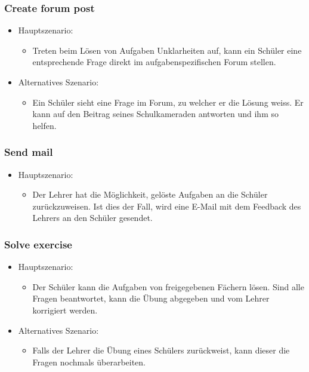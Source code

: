 \subsubsection*{Create forum post}
\begin{itemize}
	\item Hauptszenario:
	\begin{itemize}
		\item Treten beim Lösen von Aufgaben Unklarheiten auf, kann ein Schüler eine entsprechende Frage direkt im aufgabenspezifischen Forum stellen.
	\end{itemize}
	\item Alternatives Szenario:
	\begin{itemize}
		\item Ein Schüler sieht eine Frage im Forum, zu welcher er die Lösung weiss. Er kann auf den Beitrag seines Schulkameraden antworten und ihm so helfen.
	\end{itemize}
\end{itemize}


\subsubsection*{Send mail}
\begin{itemize}
	\item Hauptszenario:
	\begin{itemize}
		\item Der Lehrer hat die Möglichkeit, gelöste Aufgaben an die Schüler zurückzuweisen. Ist dies der Fall, wird eine E-Mail mit dem Feedback des Lehrers an den Schüler gesendet.
	\end{itemize}
\end{itemize}


\subsubsection*{Solve exercise}
\begin{itemize}
	\item Hauptszenario:
	\begin{itemize}
		\item Der Schüler kann die Aufgaben von freigegebenen Fächern lösen. Sind alle Fragen beantwortet, kann die Übung abgegeben und vom Lehrer korrigiert werden.
	\end{itemize}
	\item Alternatives Szenario:
	\begin{itemize}
		\item Falls der Lehrer die Übung eines Schülers zurückweist, kann dieser die Fragen nochmals überarbeiten.
	\end{itemize}
\end{itemize}

